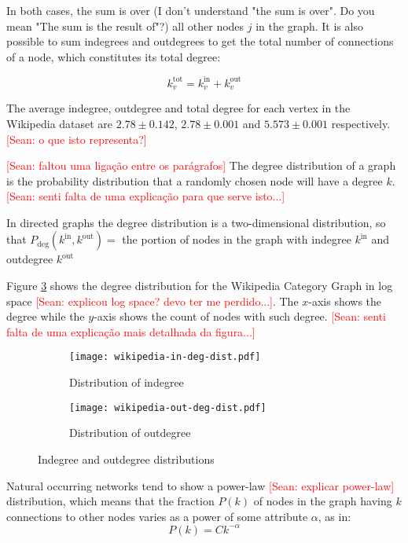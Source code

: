 In both cases, the sum is over (I don't understand "the sum is over". Do you mean "The sum is the result of"?) all other nodes $j$ in the graph. It is also possible to sum indegrees and outdegrees to get the total number of connections of a node, which constitutes its total degree: 

 \begin{equation}
k_v^{\text{tot}} = k_v^{\text{in}} +  k_v^{\text{out}}
\end{equation}

The average indegree, outdegree and total degree for each vertex in the Wikipedia dataset are $2.78\pm0.142$, $2.78\pm0.001$ and $5.573\pm0.001$ respectively. \textcolor{red}{[Sean: o que isto representa?]}


\textcolor{red}{[Sean: faltou uma ligação entre os parágrafos]} The degree distribution of a graph is the probability distribution that a randomly chosen node will have a degree $k$. \textcolor{red}{[Sean: senti falta de uma explicação para que serve isto...]}

In directed graphs the degree distribution is a two-dimensional distribution, so that $P_{\text{deg}}(k^{\text{in}},k^{\text{out}} ) =$ the portion of nodes in the graph with indegree $k^{\text{in}}$ and outdegree $k^{\text{out}}$

Figure \ref{fig:in-and-out-degree} shows the degree distribution for the Wikipedia Category Graph in log space \textcolor{red}{[Sean: explicou log space? devo ter me perdido...]}. The $x$-axis shows the degree while the $y$-axis shows the count of nodes with such degree. \textcolor{red}{[Sean: senti falta de uma explicação mais detalhada da figura...]} 

\begin{figure}
\centering
\begin{subfigure}{0.49\textwidth}
\centering
\texttt{[image: wikipedia-in-deg-dist.pdf]}
\caption{Distribution of indegree}
\label{fig:left}
\end{subfigure}
\begin{subfigure}{0.49\textwidth}
\centering
\texttt{[image: wikipedia-out-deg-dist.pdf]}
\caption{Distribution of outdegree}
\label{fig:right}
\end{subfigure}
\caption{Indegree and outdegree distributions}
\label{fig:in-and-out-degree}
\end{figure}
Natural occurring networks tend to show a power-law \textcolor{red}{[Sean: explicar power-law]} distribution, which means that the fraction $P(k)$ of nodes in the graph having $k$ connections to other nodes varies as a power of some attribute $\alpha$, as in: 
\begin{equation}
P(k)=Ck^{-\alpha}
\end{equation}

